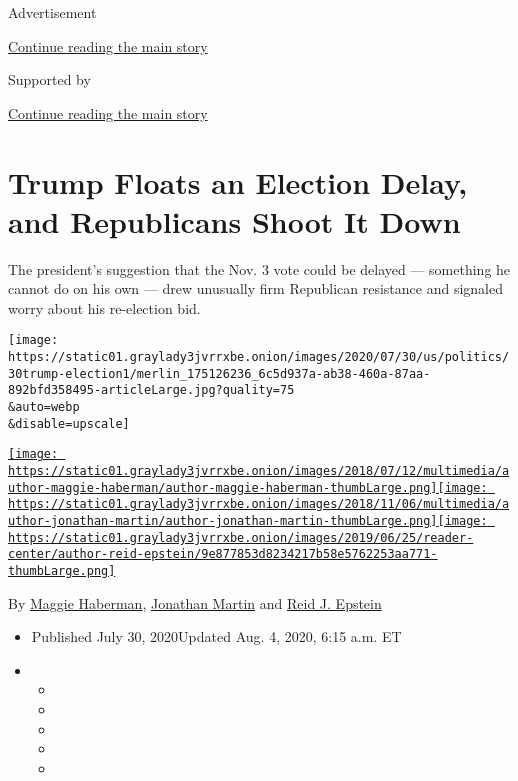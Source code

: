 Advertisement

\protect\hyperlink{after-top}{Continue reading the main story}

Supported by

\protect\hyperlink{after-sponsor}{Continue reading the main story}

\hypertarget{trump-floats-an-election-delay-and-republicans-shoot-it-down}{%
\section{Trump Floats an Election Delay, and Republicans Shoot It
Down}\label{trump-floats-an-election-delay-and-republicans-shoot-it-down}}

The president's suggestion that the Nov. 3 vote could be delayed ---
something he cannot do on his own --- drew unusually firm Republican
resistance and signaled worry about his re-election bid.

\texttt{[image: https://static01.graylady3jvrrxbe.onion/images/2020/07/30/us/politics/30trump-election1/merlin\_175126236\_6c5d937a-ab38-460a-87aa-892bfd358495-articleLarge.jpg?quality=75\\\&auto=webp\\\&disable=upscale]}

\href{https://www.nytimes3xbfgragh.onion/by/maggie-haberman}{\texttt{[image: https://static01.graylady3jvrrxbe.onion/images/2018/07/12/multimedia/author-maggie-haberman/author-maggie-haberman-thumbLarge.png]}}\href{https://www.nytimes3xbfgragh.onion/by/jonathan-martin}{\texttt{[image: https://static01.graylady3jvrrxbe.onion/images/2018/11/06/multimedia/author-jonathan-martin/author-jonathan-martin-thumbLarge.png]}}\href{https://www.nytimes3xbfgragh.onion/by/reid-j-epstein}{\texttt{[image: https://static01.graylady3jvrrxbe.onion/images/2019/06/25/reader-center/author-reid-epstein/9e877853d8234217b58e5762253aa771-thumbLarge.png]}}

By \href{https://www.nytimes3xbfgragh.onion/by/maggie-haberman}{Maggie
Haberman},
\href{https://www.nytimes3xbfgragh.onion/by/jonathan-martin}{Jonathan
Martin} and
\href{https://www.nytimes3xbfgragh.onion/by/reid-j-epstein}{Reid J.
Epstein}

\begin{itemize}
\item
  Published July 30, 2020Updated Aug. 4, 2020, 6:15 a.m. ET
\item
  \begin{itemize}
  \item
  \item
  \item
  \item
  \item
  \end{itemize}
\end{itemize}

